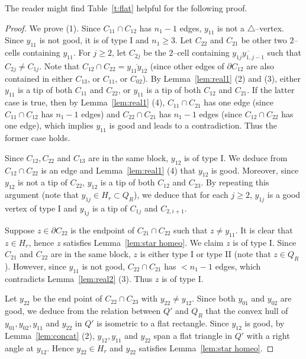 \documentclass[11pt]{amsart}
\theoremstyle{definition}
\begin{document}
The reader might find Table~\ref{t:flat} helpful for the following proof. 
\begin{proof}
	We prove (1). Since $C_{11}\cap C_{12}$ has $n_1-1$ edges, $y_{11}$ is not a $\triangle$--vertex. Since $y_{11}$ is not good, it is of type I and $n_1\ge 3$. Let $C_{22}$ and $C_{21}$ be other two $2$--cells containing $y_{11}$. For $j\ge 2$, let $C_{2j}$ be the $2$--cell containing $\overline{y_{1j}y_{1,j-1}}$ such that $C_{2j}\neq C_{1j}$. Note that $C_{12}\cap C_{22}=\overline{y_{11}y_{12}}$ (since other edges of $\partial C_{12}$ are also contained in either $C_{13}$, or $C_{11}$, or $C_{02}$). By Lemma~\ref{lem:real1} (2) and (3), either $y_{11}$ is a tip of both $C_{11}$ and $C_{22}$, or $y_{11}$ is a tip of both $C_{12}$ and $C_{21}$. If the latter case is true, then by Lemma~\ref{lem:real1} (4), $C_{11}\cap C_{21}$ has one edge (since $C_{11}\cap C_{12}$ has $n_1-1$ edges) and $C_{22}\cap C_{21}$ has $n_1-1$ edges (since $C_{12}\cap C_{22}$ has one edge), which implies $y_{11}$ is good and leads to a contradiction. Thus the former case holds.
	
	Since $C_{12},C_{22}$ and $C_{13}$ are in the same block, $y_{12}$ is of type I. We deduce from $C_{12}\cap C_{22}$ is an edge and Lemma~\ref{lem:real1} (4) that $y_{12}$ is good. Moreover, since $y_{12}$ is not a tip of $C_{22}$, $y_{12}$ is a tip of both $C_{12}$ and $C_{23}$. By repeating this argument (note that $y_{1j}\in H_r\subset Q_R$), we deduce that for each $j\ge 2$, $y_{1j}$ is a good vertex of type I and $y_{1j}$ is a tip of $C_{1j}$ and $C_{2,i+1}$. 
	
	Suppose $z\in \partial C_{22}$ is the endpoint of $C_{21}\cap C_{22}$ such that $z\neq y_{11}$. It is clear that $z\in H_r$, hence $z$ satisfies Lemma~\ref{lem:star homeo}. We claim $z$ is of type I. Since $C_{21}$ and $C_{22}$ are in the same block, $z$ is either type I or type II (note that $z\in Q_R$). However, since $y_{11}$ is not good, $C_{22}\cap C_{21}$ has $< n_1-1$ edges, which contradicts Lemma~\ref{lem:real2} (3). Thus $z$ is of type I.
	
	Let $y_{22}$ be the end point of $C_{22}\cap C_{23}$ with $y_{22}\neq y_{12}$. Since both $y_{01}$ and $y_{02}$ are good, we deduce from the relation between $Q'$ and $Q_R$ that the convex hull of $y_{01},y_{02},y_{11}$ and $y_{22}$ in $Q'$ is isometric to a flat rectangle. Since $y_{12}$ is good, by Lemma~\ref{lem:concat} (2), $y_{12},y_{11}$ and $y_{22}$ span a flat triangle in $Q'$ with a right angle at $y_{12}$. Hence $y_{22}\in H_r$ and $y_{22}$ satisfies Lemma~\ref{lem:star homeo}.
	

\end{proof}
\end{document}
